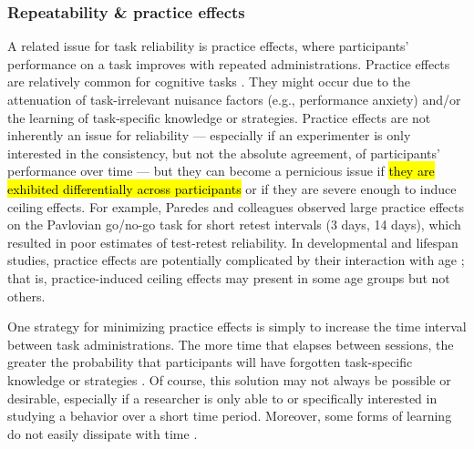 \documentclass[a4paper,12pt]{article}
\begin{document}
\subsubsection{Repeatability \& practice effects}

A related issue for task reliability is practice effects, where participants' performance on a task improves with repeated administrations. Practice effects are relatively common for cognitive tasks \cite{hausknecht2007retesting, scharfen2018retest}. They might occur due to the attenuation of task-irrelevant nuisance factors (e.g., performance anxiety) and/or the learning of task-specific knowledge or strategies. Practice effects are not inherently an issue for reliability --- especially if an experimenter is only interested in the consistency, but not the absolute agreement, of participants' performance over time --- but they can become a pernicious issue if \hl{they are exhibited differentially across participants} or if they are severe enough to induce ceiling effects. For example, Paredes and colleagues \cite{paredes2021psychometric} observed large practice effects on the Pavlovian go/no-go task for short retest intervals (3 days, 14 days), which resulted in poor estimates of test-retest reliability. In developmental and lifespan studies, practice effects are potentially complicated by their interaction with age \cite{anokhin2022age, salthouse2010influence}; that is, practice-induced ceiling effects may present in some age groups but not others. 

One strategy for minimizing practice effects is simply to increase the time interval between task administrations. The more time that elapses between sessions, the greater the probability that participants will have forgotten task-specific knowledge or strategies \cite{hausknecht2007retesting, scharfen2018retest}. Of course, this solution may not always be possible or desirable, especially if a researcher is only able to or specifically interested in studying a behavior over a short time period. Moreover, some forms of learning do not easily dissipate with time \cite{schiller2010preventing}.
\end{document}

